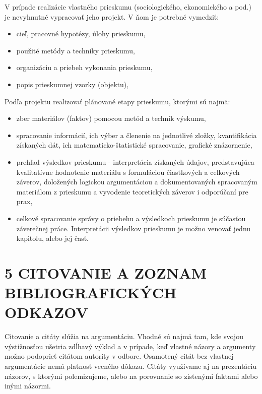 V prípade realizácie vlastného prieskumu (sociologického, ekonomického a pod.) je nevyhnutné vypracovať jeho projekt. V ňom je potrebné vymedziť:
\begin{itemize}
\item  cieľ, pracovné hypotézy, úlohy prieskumu,
\end{itemize}
\begin{itemize}
\item  použité metódy a techniky prieskumu,
\end{itemize}
\begin{itemize}
\item  organizáciu a priebeh vykonania prieskumu,
\end{itemize}
\begin{itemize}
\item  popis prieskumnej vzorky (objektu),
\end{itemize}
Podľa projektu realizovať plánované etapy prieskumu, ktorými sú najmä:
\begin{itemize}
\item  zber materiálov (faktov) pomocou metód a techník výskumu,
\end{itemize}
\begin{itemize}
\item  spracovanie informácií, ich výber a členenie na jednotlivé zložky, kvantifikácia získaných dát, ich matematicko-štatistické spracovanie, grafické znázornenie,
\end{itemize}
\begin{itemize}
\item  prehľad výsledkov prieskumu - interpretácia získaných údajov, predstavujúca kvalitatívne hodnotenie materiálu s formuláciou čiastkových a celkových záverov, doložených logickou argumentáciou a dokumentovaných spracovaným materiálom z prieskumu a vyvodenie teoretických záverov i odporúčaní pre prax,
\end{itemize}
\begin{itemize}
\item celkové spracovanie správy o priebehu a výsledkoch prieskumu je súčasťou záverečnej práce. Interpretácii výsledkov prieskumu je možno venovať jednu kapitolu, alebo jej časť.
\end{itemize}


\section{5 CITOVANIE A ZOZNAM BIBLIOGRAFICKÝCH ODKAZOV}
Citovanie a citáty slúžia na argumentáciu. Vhodné sú najmä tam, kde svojou výstižnosťou ušetria zdĺhavý výklad a v prípade, keď vlastné názory a argumenty možno podoprieť citátom autority v odbore. Osamotený citát bez vlastnej argumentácie nemá platnosť vecného dôkazu. Citáty využívame aj na prezentáciu názorov, s ktorými polemizujeme, alebo na porovnanie so zistenými faktami alebo inými názormi.

